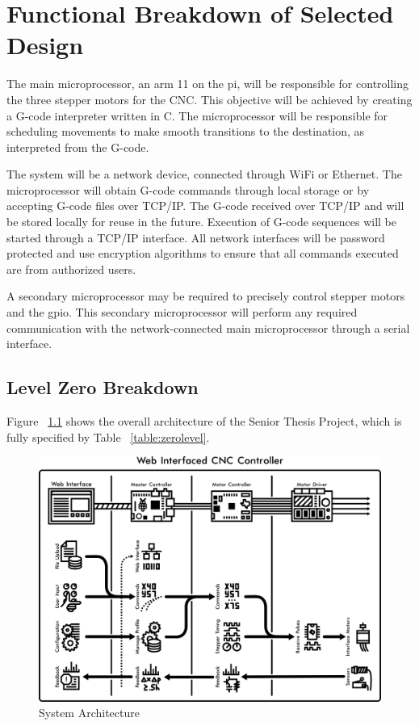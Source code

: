 \chapter{Functional Breakdown of Selected Design}
The main microprocessor, an \gls{arm} 11 on the \gls{pi}, will be responsible for controlling the three stepper motors for the CNC.
This objective will be achieved by creating a G-code interpreter written in C.
The microprocessor will be responsible for scheduling movements to make smooth transitions to the destination, as interpreted from the G-code.

The system will be a network device, connected through WiFi or Ethernet.
The microprocessor will obtain G-code commands through local storage or by accepting G-code files over TCP/IP.
The G-code received over TCP/IP and will be stored locally for reuse in the future.
Execution of G-code sequences will be started through a TCP/IP interface.
All network interfaces will be password protected and use encryption algorithms to ensure that all commands executed are from authorized users. 

A secondary microprocessor may be required to precisely control stepper motors and the \gls{gpio}.
This secondary microprocessor will perform any required communication with the network-connected main microprocessor through a serial interface. 

\section{Level Zero Breakdown}
Figure ~\ref{fig:architecture} shows the overall architecture of the Senior Thesis Project, which is fully specified by Table ~\ref{table:zerolevel}.

\begin{figure}[h]
	\centering
	\includegraphics[width=1\textwidth]{architecture.png}
	\caption{System Architecture}
	\label{fig:architecture}
\end{figure}

